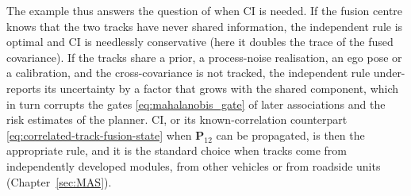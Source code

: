 \documentclass[graybox,envcountchap]{style/SNmono}
\begin{document}
\begin{example}
The example thus answers the question of when CI is needed. If the fusion centre knows that the two tracks have never shared information, the independent rule is optimal and CI is needlessly conservative (here it doubles the trace of the fused covariance). If the tracks share a prior, a process-noise realisation, an ego pose or a calibration, and the cross-covariance is not tracked, the independent rule under-reports its uncertainty by a factor that grows with the shared component, which in turn corrupts the gates \eqref{eq:mahalanobis_gate} of later associations and the risk estimates of the planner. CI, or its known-correlation counterpart \eqref{eq:correlated-track-fusion-state} when $\mathbf{P}_{12}$ can be propagated, is then the appropriate rule, and it is the standard choice when tracks come from independently developed modules, from other vehicles or from roadside units (Chapter~\ref{sec:MAS}).
\end{example}
\end{document}
